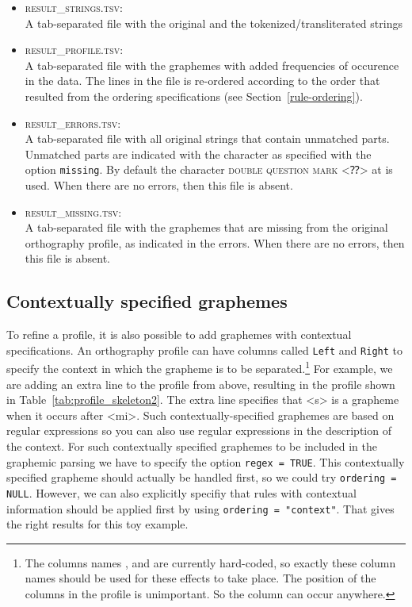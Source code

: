 \begin{itemize}
  
   \item \textsc{result\_strings.tsv}:\\ A tab-separated file with the original
         and the tokenized/transliterated strings

   \item \textsc{result\_profile.tsv}:\\ A tab-separated file with the
         graphemes with added frequencies of occurence in the data. The lines
         in the file is re-ordered according to the order that resulted from the
         ordering specifications (see Section~\ref{rule-ordering}).

   \item \textsc{result\_errors.tsv}:\\ A tab-separated file with all original
         strings that contain unmatched parts. Unmatched parts are indicated
         with the character as specified with the option \texttt{missing}. By
         default the character \textsc{double question mark} <⁇> at
          is used. When there are no errors, then this file is 
         absent.

    \item \textsc{result\_missing.tsv}:\\ A tab-separated file with the graphemes
          that are missing from the original orthography profile, as indicated in
          the errors. When there are no errors, then this file is absent.
          
\end{itemize}

\subsection*{Contextually specified graphemes}
\label{contextual-specification}

To refine a profile, it is also possible to add graphemes with contextual
specifications. An orthography profile can have columns called \texttt{Left} and
\texttt{Right} to specify the context in which the grapheme is to be
separated.\footnote{The columns names ,  and
 are currently hard-coded, so exactly these column names
should be used for these effects to take place. The position of the columns in
the profile is unimportant. So the column  can occur anywhere.}
For example, we are adding an extra line to the profile from above, resulting in
the profile shown in Table~\ref{tab:profile_skeleton2}. The extra line specifies
that <s> is a grapheme when it occurs after <mi>. Such contextually-specified
graphemes are based on regular expressions so you can also use regular
expressions in the description of the context. For such contextually specified
graphemes to be included in the graphemic parsing we have to specify the option
\texttt{regex = TRUE}. This contextually specified grapheme should actually be
handled first, so we could try \texttt{ordering = NULL}. However, we can also
explicitly specifiy that rules with contextual information should be applied
first by using \texttt{ordering = "context"}. That gives the right results for
this toy example.

